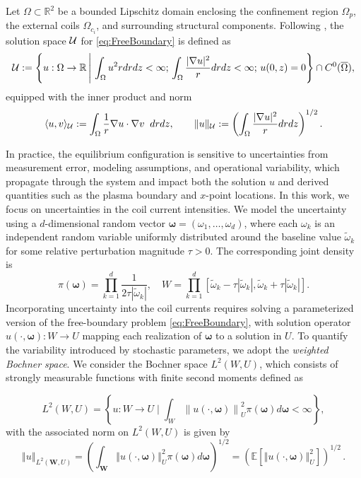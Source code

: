 Let $\Omega \subset \mathbb{R}^2$ be a bounded Lipschitz domain enclosing the confinement region $\Omega_p$, the external coils $\Omega_{c_i}$, and surrounding structural components.  
Following \cite{Gr:1999}, the solution space $\mathcal{U}$ for \eqref{eq:FreeBoundary} is defined as
%
\begin{equation}\label{eq:Soln_space}
    \mathcal{U}:=\left\{u:\Omega\rightarrow \mathbb{R} \,\Bigg| \,\int_\Omega u^2rdrdz<\infty; \,  \int_\Omega\frac{|\nabla u|^2}{r}drdz<\infty; \, u(0,z)=0 \right\}\cap C^0(\overline{\Omega}),
\end{equation}
%
equipped with the inner product and norm
%
\begin{equation}\label{eq:inner_prod_norm}
        \langle u,v\rangle_{\mathcal{U}} := \int_{\Omega} \frac{1}{r} \nabla u\cdot\nabla v \;\;drdz,\qquad \| u \|_{\mathcal{U}} :=\left(\int_\Omega\frac{|\nabla u|^2}{r} drdz\right)^{1/2}.
\end{equation}
%

In practice, the equilibrium configuration is sensitive to uncertainties from measurement error, modeling assumptions, and operational variability, which propagate through the system and impact both the solution $u$ and derived quantities such as the plasma boundary and $x$-point locations. In this work, we focus on uncertainties in the coil current intensities. We model the uncertainty using a $d$-dimensional random vector $\boldsymbol{\omega} = (\omega_1, \ldots, \omega_d)$, where each $\omega_k$ is an independent random variable uniformly distributed around the baseline value $\widetilde{\omega}_k$ for some relative perturbation magnitude $\tau > 0$. The corresponding joint density is
%
\[
\pi \left(\boldsymbol{\omega}\right)=\prod_{k=1}^{d} \frac{1}{2\tau |\widetilde{\omega}_k|},\quad W=\prod_{k=1}^{d}\left[\widetilde{\omega}_k-\tau \left\vert \widetilde{\omega}_k\right\vert,\widetilde{\omega}_k+\tau \left\vert \widetilde{\omega}_k \right\vert\right].
\]
%
Incorporating uncertainty into the coil currents requires solving a parameterized version of the free-boundary problem \eqref{eq:FreeBoundary}, with solution operator $u(\cdot,\boldsymbol{\omega}) : W \to U$ mapping each realization of $\boldsymbol{\omega}$ to a solution in $U$. To quantify the variability introduced by stochastic parameters, we adopt the {\it weighted Bochner space}. We consider the Bochner space $L^2(W,U)$, which consists of strongly measurable functions with finite second moments defined as

\[
L^2(W,U) = \left\{u:W\rightarrow U\; \bigg\vert \;\int_{W}\left\|u(\cdot,\boldsymbol{\omega})\right\|_{U}^2\pi(\boldsymbol{\omega})d\boldsymbol{\omega}<\infty\right\},
\]
%
with the associated norm on $L^2(W,U)$ is given by
%
\[
\left\Vert u \right\Vert_{L^2(\boldsymbol W,U)} =
    \left(\int_{\boldsymbol W} \left\Vert u(\cdot,\boldsymbol{\omega})  \right\Vert_{U}^2 \pi(\boldsymbol{\omega})d\boldsymbol{\omega} \right)^{1/2} = \left(\mathbb{E}\left[\left\Vert u(\cdot,\boldsymbol{\omega})  \right\Vert_{U}^2\right]\right)^{1/2}\,. 
\]
%

